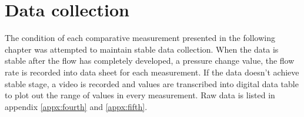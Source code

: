 \section{Data collection}

The condition of each comparative measurement presented in the following chapter was attempted to maintain stable data collection. When the data is stable after the flow has completely developed, a pressure change value, the flow rate is recorded into data sheet for each measurement. If the data doesn't achieve stable stage, a video is recorded and values are transcribed into digital data table to plot out the range of values in every measurement. Raw data is listed in appendix \ref{appx:fourth} and \ref{appx:fifth}.

\clearpage %

